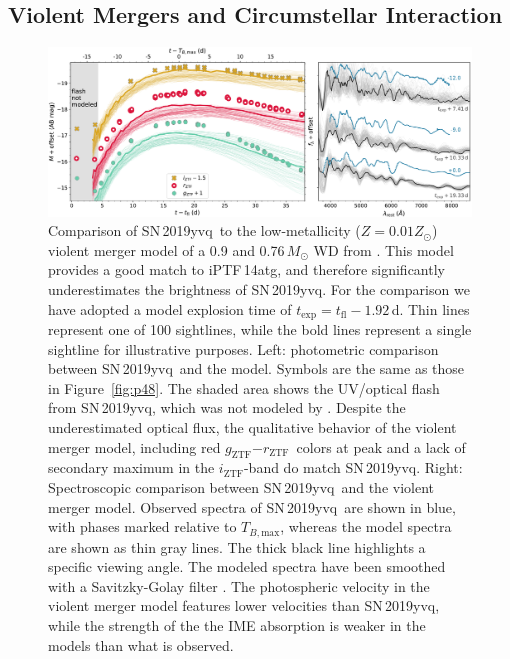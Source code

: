 \documentclass[twocolumn]{aastex63}
\newcommand{\rztf}{$r_\mathrm{ZTF}$}
\newcommand{\gztf}{$g_\mathrm{ZTF}$}
\newcommand{\iztf}{$i_\mathrm{ZTF}$}
\newcommand{\tbmax}{$T_{B,\mathrm{max}}$}
\newcommand{\sn}{SN\,2019yvq}
\begin{document}
\subsection{Violent Mergers and Circumstellar
Interaction}\label{sec:merger_csm}

\begin{figure}[ht]
    \centering
    \includegraphics[width=\textwidth]{./figures/violent_merger.pdf}
    \caption{Comparison of \sn\ to the low-metallicity ($Z = 0.01 Z_\odot$)
    violent merger model of a 0.9 and 0.76\,$M_\odot$ WD from
    \citet{Kromer16}. This model provides a good match to iPTF\,14atg, and
    therefore significantly underestimates the brightness of \sn. For the
    comparison we have adopted a model explosion time of $t_\mathrm{exp} =
    t_\mathrm{fl} - 1.92$\,d. Thin lines represent one of 100 sightlines,
    while the bold lines represent a single sightline for illustrative
    purposes. Left: photometric comparison between \sn\ and the model. Symbols
    are the same as those in Figure~\ref{fig:p48}. The shaded area shows the
    UV/optical flash from \sn, which was not modeled by \citet{Kromer16}.
    Despite the underestimated optical flux, the qualitative behavior of the
    violent merger model, including red \gztf$ - $\rztf\ colors at peak and a
    lack of secondary maximum in the \iztf-band do match \sn. Right:
    Spectroscopic comparison between \sn\ and the violent merger model.
    Observed spectra of \sn\ are shown in blue, with phases marked relative to
    \tbmax, whereas the model spectra are shown as thin gray lines. The thick
    black line highlights a specific viewing angle. The modeled spectra have
    been smoothed with a Savitzky-Golay filter \citep{Savitzky64}. The
    photospheric velocity in the violent merger model features lower
    velocities than \sn, while the strength of the the IME absorption is
    weaker in the models than what is observed.}
    \label{fig:violent_merger}
\end{figure}
\end{document}
